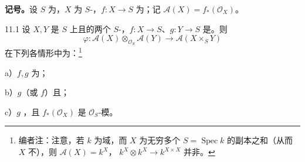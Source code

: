 \textbf{记号。}设 $S$ 为，$X$ 为 $S$-，$f:X\to S$ 为；记 $\mathcal A(X)=f_*(\mathcal O_X)$。
\begin{SGAresult}{}{11.1}
设 $X,Y$ 是 $S$ 上且的两个 $S$-，$f:X\to S$、$g:Y\to S$ 是。则
\[
\varphi:\mathcal A(X)\otimes_{\mathcal O_S}\mathcal A(Y)\longrightarrow\mathcal A(X\times_S Y)
\]
在下列各情形中为：\footnote{编者注：注意，若 $k$ 为域，而 $X$ 为无穷多个 $S=\operatorname{Spec}k$ 的副本之和（从而 $X$ 不），则 $\mathcal A(X)=k^X$， $k^X\otimes k^X\to k^{X\times X}$ 并非。}

 a）$f,g$ 为；

 b）$g$（或 $f$）且；

 c）$g$ ，且 $f_*(\mathcal O_X)$ 是 $\mathcal O_S$-模。
\end{SGAresult}
